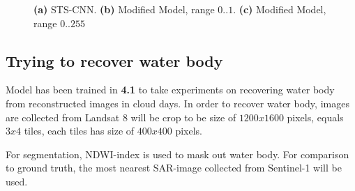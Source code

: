 \begin{figure}[]
	\centering
	\centering
	\caption{
		\textbf{(a)} STS-CNN.
		\textbf{(b)} Modified Model, range $0..1$.
		\textbf{(c)} Modified Model, range $0..255$}
	\label{fig:improvedModel_experiment_3}
\end{figure}


\subsection{Trying to recover water body}\label{experiment_timeSeriesModel}
Model has been trained in \textbf{4.1} to take experiments on recovering water body from reconstructed images in cloud days. In order to recover water body, images are collected from Landsat 8 will be crop to be size of $1200 x 1600$ pixels, equals $3 x 4$ tiles, each tiles has size of $400 x 400$ pixels.  

For segmentation, NDWI-index is used to mask out water body. For comparison to ground truth, the most nearest SAR-image collected from Sentinel-1 will be used. 

